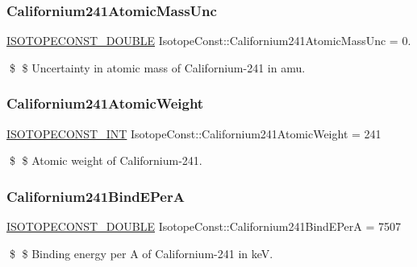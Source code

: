 \subsubsection{\texorpdfstring{Californium241\+Atomic\+Mass\+Unc}{Californium241AtomicMassUnc}}
{\footnotesize\ttfamily \mbox{\hyperlink{group___isotope_const-_macros_ga8f45a7272ce02c0b4c65c44636ed719a}{I\+S\+O\+T\+O\+P\+E\+C\+O\+N\+S\+T\+\_\+\+D\+O\+U\+B\+LE}} Isotope\+Const\+::\+Californium241\+Atomic\+Mass\+Unc = 0.}

\$ \$ Uncertainty in atomic mass of Californium-\/241 in amu. \mbox{\label{group___isotope_const-_californium-_cf241_ga47f9ea4a0a75bd4733336ca283887ca6}} 
\subsubsection{\texorpdfstring{Californium241\+Atomic\+Weight}{Californium241AtomicWeight}}
{\footnotesize\ttfamily \mbox{\hyperlink{group___isotope_const-_macros_ga5f18360b3e99483a35c32d789e62621c}{I\+S\+O\+T\+O\+P\+E\+C\+O\+N\+S\+T\+\_\+\+I\+NT}} Isotope\+Const\+::\+Californium241\+Atomic\+Weight = 241}

\$ \$ Atomic weight of Californium-\/241. \mbox{\label{group___isotope_const-_californium-_cf241_ga28d951e7e494322ff667ff38aab40237}} 
\subsubsection{\texorpdfstring{Californium241\+Bind\+E\+PerA}{Californium241BindEPerA}}
{\footnotesize\ttfamily \mbox{\hyperlink{group___isotope_const-_macros_ga8f45a7272ce02c0b4c65c44636ed719a}{I\+S\+O\+T\+O\+P\+E\+C\+O\+N\+S\+T\+\_\+\+D\+O\+U\+B\+LE}} Isotope\+Const\+::\+Californium241\+Bind\+E\+PerA = 7507}

\$ \$ Binding energy per A of Californium-\/241 in keV. \mbox{\label{group___isotope_const-_californium-_cf241_gaff796dfd3f46a22a07a8c0ef280242c7}} 

